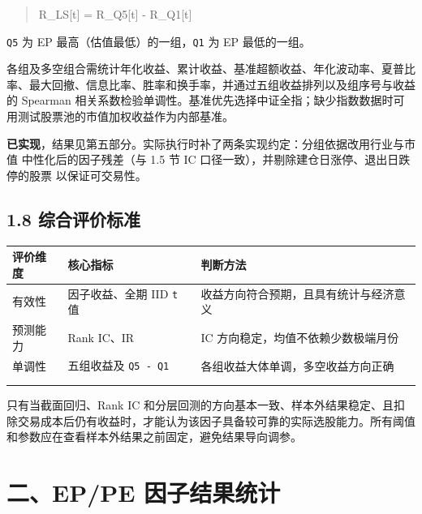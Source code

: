 \documentclass[UTF8,a4paper,11pt]{ctexart}
\begin{document}
\begin{quote}\ttfamily\small
R\_LS[t] = R\_Q5[t] - R\_Q1[t]\\
\end{quote}

\texttt{Q5} 为 EP 最高（估值最低）的一组，\texttt{Q1} 为 EP 最低的一组。

各组及多空组合需统计年化收益、累计收益、基准超额收益、年化波动率、夏普比率、最大回撤、信息比率、胜率和换手率，并通过五组收益排列以及组序号与收益的 Spearman 相关系数检验单调性。基准优先选择中证全指；缺少指数数据时可用测试股票池的市值加权收益作为内部基准。

\textbf{已实现}，结果见第五部分。实际执行时补了两条实现约定：分组依据改用行业与市值
中性化后的因子残差（与 1.5 节 IC 口径一致），并剔除建仓日涨停、退出日跌停的股票
以保证可交易性。

{}
\subsection*{1.8 综合评价标准}

\begin{table}[htbp]
\centering
\begin{tabularx}{\textwidth}{@{}YYY@{}}
\toprule
评价维度 & 核心指标 & 判断方法 \\
\midrule
有效性 & 因子收益、全期 IID \texttt{t} 值 & 收益方向符合预期，且具有统计与经济意义 \\
预测能力 & Rank IC、IR & IC 方向稳定，均值不依赖少数极端月份 \\
单调性 & 五组收益及 \texttt{Q5 - Q1} & 各组收益大体单调，多空收益方向正确 \\
 &  &  \\
 &  &  \\
\bottomrule
\end{tabularx}
\end{table}

只有当截面回归、Rank IC 和分层回测的方向基本一致、样本外结果稳定、且扣除交易成本后仍有收益时，才能认为该因子具备较可靠的实际选股能力。所有阈值和参数应在查看样本外结果之前固定，避免结果导向调参。

{}
\section*{二、EP/PE 因子结果统计}

{}
\end{document}
